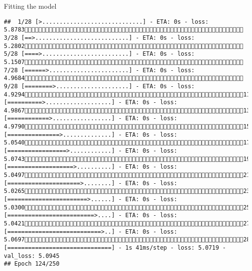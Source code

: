 \documentclass[
  ignorenonframetext,
]{beamer}
\begin{document}
\begin{frame}[fragile]{Fitting the model}
\begin{verbatim}
##  1/28 [>.............................] - ETA: 0s - loss: 5.8783 3/28 [==>...........................] - ETA: 0s - loss: 5.2802 5/28 [====>.........................] - ETA: 0s - loss: 5.1507 7/28 [======>.......................] - ETA: 0s - loss: 4.9684 9/28 [========>.....................] - ETA: 0s - loss: 4.929411/28 [==========>...................] - ETA: 0s - loss: 4.986713/28 [============>.................] - ETA: 0s - loss: 4.979015/28 [===============>..............] - ETA: 0s - loss: 5.054017/28 [=================>............] - ETA: 0s - loss: 5.074319/28 [===================>..........] - ETA: 0s - loss: 5.049721/28 [=====================>........] - ETA: 0s - loss: 5.026523/28 [=======================>......] - ETA: 0s - loss: 5.030025/28 [=========================>....] - ETA: 0s - loss: 5.042127/28 [===========================>..] - ETA: 0s - loss: 5.069728/28 [==============================] - 1s 41ms/step - loss: 5.0719 - val_loss: 5.0945
## Epoch 124/250

\end{verbatim}
\end{frame}
\end{document}
